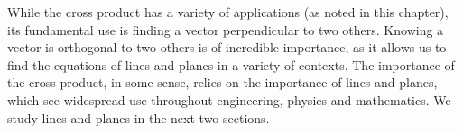 While the cross product has a variety of applications (as noted in this chapter), its fundamental use is finding a vector perpendicular to two others. Knowing a vector is orthogonal to two others is of incredible importance, as it allows us to find the equations of lines and planes in a variety of contexts. The importance of the cross product, in some sense, relies on the importance of lines and planes, which see widespread use throughout engineering, physics and mathematics. We study lines and planes in the next two sections. 


